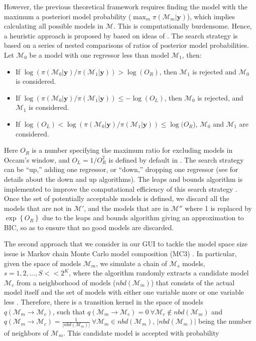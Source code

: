 However, the previous theoretical framework requires finding the model with the maximum a posteriori model probability ($\max_m {\pi(\mathcal{M}_m|\bm{y})}$), which implies calculating all possible models in $\mathcal{M}$. This is computationally burdensome. Hence, a heuristic approach is proposed by \cite{Raftery2012} based on ideas of \cite{Madigan1994}. The search strategy is based on a series of nested comparisons of ratios of posterior model probabilities. Let $\mathcal{M}_0$ be a model with one regressor less than model $\mathcal{M}_1$, then:
\begin{itemize}
	\item If $\log(\pi(\mathcal{M}_0|\bm{y})/\pi(\mathcal{M}_1|\bm{y}))>\log(O_R)$, then $\mathcal{M}_1$ is rejected and $\mathcal{M}_0$ is considered.
	\item If $\log(\pi(\mathcal{M}_0|\bm{y})/\pi(\mathcal{M}_1|\bm{y}))\leq -\log(O_L)$, then $\mathcal{M}_0$ is rejected, and $\mathcal{M}_1$ is considered.
	 \item If $\log(O_L)<\log(\pi(\mathcal{M}_0|\bm{y})/\pi(\mathcal{M}_1|\bm{y}))\leq \log(O_R$), $\mathcal{M}_0$ and $\mathcal{M}_1$ are considered.
\end{itemize} 
Here $O_R$ is a number specifying the maximum ratio for excluding models in Occam's window, and $O_L=1/O_R^{2}$ is defined by default in \cite{Raftery2012}. The search strategy can be ``up,'' adding one regressor, or ``down,'' dropping one regressor (see \cite{Madigan1994} for details about the down and up algorithms). The leaps and bounds algorithm \cite{Furnival1974} is implemented to improve the computational efficiency of this search strategy \cite{Raftery2012}. Once the set of potentially acceptable models is defined, we discard all the models that are not in $\mathcal{M}'$, and the models that are in $\mathcal{M}''$ where 1 is replaced by $\exp\left\{O_R\right\}$ due to the leaps and bounds algorithm giving an approximation to BIC, so as to ensure that no good models are discarded.

The second approach that we consider in our GUI to tackle the model space size issue is Markov chain Monte Carlo model composition (MC3) \cite{madigan1995bayesian1}.
In particular, given the space of models $\mathcal{M}_m$, we simulate a chain of $\mathcal{M}_s$ models, $s = 1, 2, ..., S<<2^K$, where the algorithm randomly extracts a candidate model $\mathcal{M}_c$ from a neighborhood of models ($nbd(\mathcal{M}_m)$) that consists of the actual model itself and the set of models with either one variable more or one variable less \cite{Raftery1997}. Therefore, there is a transition kernel in the space of models $q(\mathcal{M}_m\rightarrow \mathcal{M}_c)$, such that $q(\mathcal{M}_m\rightarrow \mathcal{M}_{c})=0 \ \forall \mathcal{M}_{c}\notin nbd(\mathcal{M}_m)$ and $q(\mathcal{M}_m\rightarrow \mathcal{M}_{c})=\frac{1}{|nbd(\mathcal{M}_m)|} \ \forall \mathcal{M}_m\in nbd(\mathcal{M}_m)$, $|nbd(\mathcal{M}_m)|$ being the number of neighbors of $\mathcal{M}_m$. This candidate model is accepted with probability

